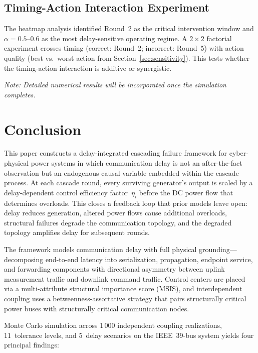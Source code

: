 \documentclass[a4paper,fleqn]{cas-dc}
\begin{document}
\subsection{Timing-Action Interaction Experiment}\label{sec:timing}

The heatmap analysis identified Round~2 as the critical intervention
window and $\alpha=0.5$--$0.6$ as the most delay-sensitive operating
regime.  A $2\times2$ factorial experiment crosses timing (correct:
Round~2; incorrect: Round~5) with action quality (best vs.\ worst
action from Section~\ref{sec:sensitivity}).  This tests whether the
timing-action interaction is additive or synergistic.

\emph{Note: Detailed numerical results will be incorporated once the
simulation completes.}


\section{Conclusion}\label{sec:conclusion}

This paper constructs a delay-integrated cascading failure framework for
cyber-physical power systems in which communication delay is not an
after-the-fact observation but an endogenous causal variable embedded
within the cascade process.  At each cascade round, every surviving
generator's output is scaled by a delay-dependent control efficiency
factor~$\eta_i$ before the DC power flow that determines overloads.
This closes a feedback loop that prior models leave open: delay reduces
generation, altered power flows cause additional overloads, structural
failures degrade the communication topology, and the degraded topology
amplifies delay for subsequent rounds.

The framework models communication delay with full physical
grounding---decomposing end-to-end latency into serialization,
propagation, endpoint service, and forwarding components with
directional asymmetry between uplink measurement traffic and downlink
command traffic.  Control centers are placed via a multi-attribute
structural importance score (MSIS), and interdependent coupling uses a
betweenness-assortative strategy that pairs structurally critical power
buses with structurally critical communication nodes.

Monte Carlo simulation across 1\,000 independent coupling realizations,
11~tolerance levels, and 5~delay scenarios on the IEEE~39-bus system
yields four principal findings:
\end{document}
